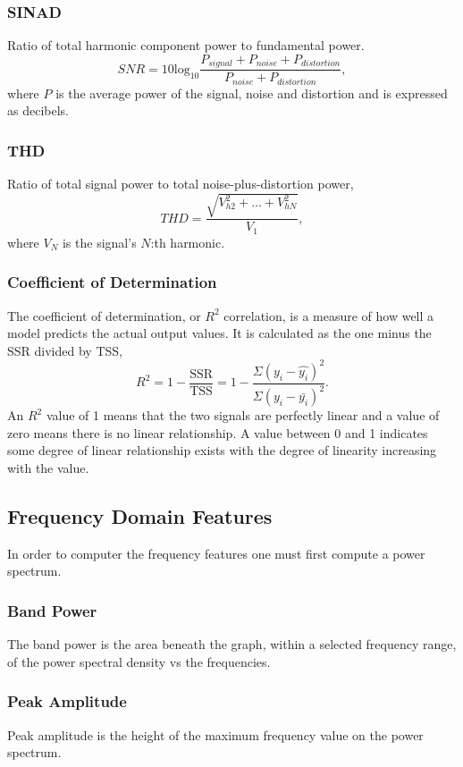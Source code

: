 \documentclass[]{article}
\begin{document}
\subsubsection*{\gls{SINAD}}
Ratio of total harmonic component power to fundamental power.
\begin{equation}
	SNR = 10 \textrm{log}_{10} \frac{P_{signal} + P_{noise} + P_{distortion}}{P_{noise} + P_{distortion}}, 
\end{equation}
where $P$ is the average power of the signal, noise and distortion and is expressed as decibels.
\subsubsection*{\gls{THD}}
Ratio of total signal power to total noise-plus-distortion power,
\begin{equation}
	THD = \frac{\sqrt{V^2_{h2} + \hdots + V^2_{hN}}}{V_1},
\end{equation}
where $V_N$ is the signal's $N$:th harmonic.
\subsubsection*{Coefficient of Determination}
The coefficient of determination, or $R^{2}$ correlation, is a measure of how well a model predicts the actual output values. It is calculated as the one minus the \gls{SSR} divided by \gls{TSS},
\begin{equation}
R^{2} = 1 - \frac{\textrm{SSR}}{\textrm{TSS}} = 1 - \frac{\Sigma(y_i - \hat{y_i})^2}{\Sigma(y_i - \bar{y_i})^2}. 
\end{equation}
An $R^{2}$ value of 1 means that the two signals are perfectly linear and a value of zero means there is no linear relationship. A value between 0 and 1 indicates some degree of linear relationship exists with the degree of linearity increasing with the value.
\subsection{Frequency Domain Features}
In order to computer the frequency features one must first compute a power spectrum.
\subsubsection*{Band Power}
The band power is the area beneath the graph, within a selected frequency range, of the power spectral density vs the frequencies.
\subsubsection*{Peak Amplitude}
Peak amplitude is the height of the maximum frequency value on the power spectrum.
\end{document}
